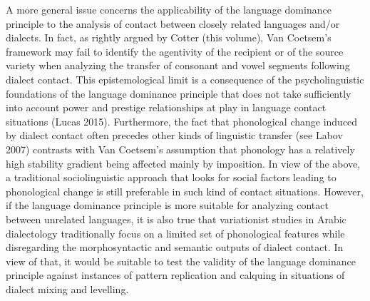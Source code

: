 \documentclass[output=paper]{langsci/langscibook}
\begin{document}
A more general issue concerns the applicability of the language dominance principle to the analysis of contact between closely related languages and/or dialects. In fact, as rightly argued by Cotter (this volume), Van Coetsem’s framework may fail to identify the agentivity of the recipient or of the source variety when analyzing the transfer of consonant and vowel segments following dialect contact. This epistemological limit is a consequence of the psycholinguistic foundations of the language dominance principle that does not take sufficiently into account power and prestige relationships at play in language contact situations (Lucas 2015). Furthermore, the fact that phonological change induced by dialect contact often precedes other kinds of linguistic transfer (see Labov 2007) contrasts with Van Coetsem’s assumption that phonology has a relatively high stability gradient being affected mainly by imposition. In view of the above, a traditional sociolinguistic approach that looks for social factors leading to phonological change is still preferable in such kind of contact situations. However, if the language dominance principle is more suitable for analyzing contact between unrelated languages, it is also true that variationist studies in Arabic dialectology traditionally focus on a limited set of phonological features while disregarding the morphosyntactic and semantic outputs of dialect contact. In view of that, it would be suitable to test the validity of the language dominance principle against instances of pattern replication and calquing in situations of dialect mixing and levelling. 
\end{document}
